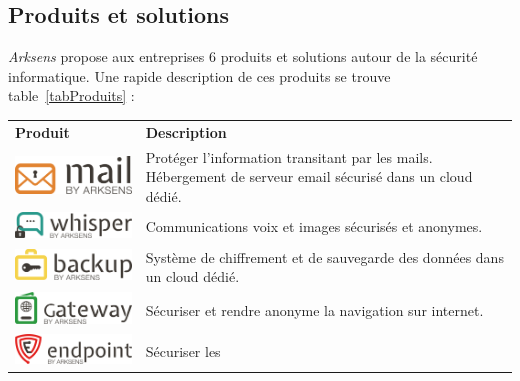 \documentclass[a4paper,10pt, twoside]{report}
\begin{document}
\begin{spacing}{1.2}
\subsection{Produits et solutions}
\textit{Arksens} propose aux entreprises 6 produits et solutions autour de la
s\'ecurit\'e informatique. Une rapide description de ces produits se trouve
table~\ref{tabProduits} :
\begin{table}[h!]
  \centering
  \def\arraystretch{1.5}
  \setlength{\fboxsep}{13pt} %
  \setlength{\fboxrule}{0pt} %
  \begin{tabular}{m{6cm}m{6cm}}
   \rowcolor{arkred} 
    \arrayrulecolor{gray73}\hline
    \color{white} \textbf{Produit} & \color{white} \textbf{Description} \\
    \includegraphics[width=5cm, fbox]{produits/mail.png} & Prot\'eger l'information
    transitant par les mails. H\'ebergement de serveur email s\'ecuris\'e dans
    un cloud d\'edi\'e.\\
    \hline
    \includegraphics[width=5cm, fbox]{produits/whisper.png} & Communications voix
    et images s\'ecuris\'es et anonymes.\\
    \hline
    \includegraphics[width=5cm, fbox]{produits/backup.png} & Syst\`eme de
    chiffrement et de sauvegarde des donn\'ees dans un cloud d\'edi\'e.\\
    \hline
    \includegraphics[width=5cm, fbox]{produits/gateway.png} & S\'ecuriser et
    rendre anonyme la navigation sur internet.\\
    \hline
    \includegraphics[width=5cm, fbox]{produits/endpoint.png} & S\'ecuriser les

\end{tabular}
\end{table}
\end{spacing}
\end{document}
